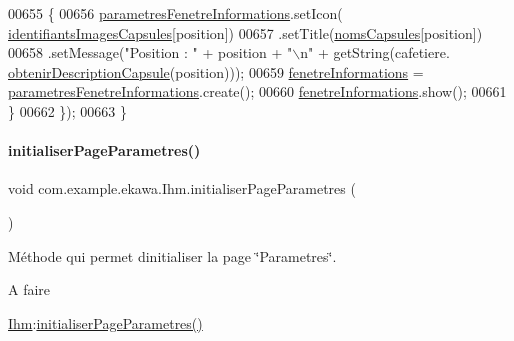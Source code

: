 \begin{DoxyCode}
00655             \{
00656                 \hyperlink{classcom_1_1example_1_1ekawa_1_1_ihm_a610b25d0bf8b26fbf1ed24345acef189}{parametresFenetreInformations}.setIcon(
      \hyperlink{classcom_1_1example_1_1ekawa_1_1_ihm_af35b42764d9f7b10c8bc0e210c3ba76d}{identifiantsImagesCapsules}[position])
00657                         .setTitle(\hyperlink{classcom_1_1example_1_1ekawa_1_1_ihm_a9d61b7bfd998d449bb405dcf5e6e4e89}{nomsCapsules}[position])
00658                         .setMessage(\textcolor{stringliteral}{"Position : "} + position + \textcolor{stringliteral}{"\(\backslash\)n"} + getString(cafetiere.
      \hyperlink{classcom_1_1example_1_1ekawa_1_1_cafetiere_ac9ff316ec5e971d52f595dc4594e7b5b}{obtenirDescriptionCapsule}(position)));
00659                 \hyperlink{classcom_1_1example_1_1ekawa_1_1_ihm_a369f219339f23afe8a6d1d93bf6611ca}{fenetreInformations} = 
      \hyperlink{classcom_1_1example_1_1ekawa_1_1_ihm_a610b25d0bf8b26fbf1ed24345acef189}{parametresFenetreInformations}.create();
00660                 \hyperlink{classcom_1_1example_1_1ekawa_1_1_ihm_a369f219339f23afe8a6d1d93bf6611ca}{fenetreInformations}.show();
00661             \}
00662         \});
00663     \}
\end{DoxyCode}
\mbox{\label{classcom_1_1example_1_1ekawa_1_1_ihm_af18a3c8df11503003c92e8e5de89b7c3}} 
\paragraph{\texorpdfstring{initialiser\+Page\+Parametres()}{initialiserPageParametres()}}
{\footnotesize\ttfamily void com.\+example.\+ekawa.\+Ihm.\+initialiser\+Page\+Parametres (\begin{DoxyParamCaption}{ }\end{DoxyParamCaption})\hspace{0.3cm}{\ttfamily [private]}}



Méthode qui permet d\textquotesingle{}initialiser la page \char`\"{}\+Parametres\char`\"{}. 

\begin{DoxyRefDesc}{A faire}
\item[\hyperlink{todo__todo000002}{A faire}]\hyperlink{classcom_1_1example_1_1ekawa_1_1_ihm}{Ihm}\+:\hyperlink{classcom_1_1example_1_1ekawa_1_1_ihm_af18a3c8df11503003c92e8e5de89b7c3}{initialiser\+Page\+Parametres()} \end{DoxyRefDesc}



